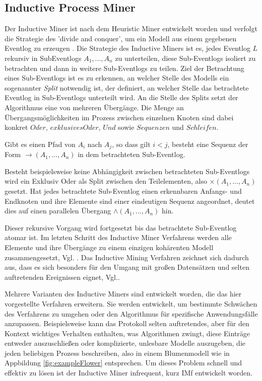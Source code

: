 \subsection{Inductive Process Miner}
Der Inductive Miner ist nach dem Heuristic Miner entwickelt worden und verfolgt die Strategie des 'divide and conquer', um ein Modell aus einem gegebenen Eventlog zu erzeugen \cite{inducMining}. 
Die Strategie des Inductive Miners ist es, jedes Eventlog $L$ rekursiv in SubEventlogs $A_1 , ... , A_n$ zu unterteilen, diese Sub-Eventlogs isoliert zu betrachten und dann in weitere Sub-Eventlogs zu teilen. 
Ziel der Betrachtung eines Sub-Eventlogs ist es zu erkennen, an welcher Stelle des Modells ein sogenannter \textit{Split} notwendig ist, der definiert, an welcher Stelle das betrachtete Eventlog in Sub-Eventlogs unterteilt wird. An die Stelle des Splits setzt der Algorithmus eine von mehreren Übergänge. Die Menge an Übergangsmöglichkeiten im Prozess zwischen einzelnen Knoten sind dabei konkret $Oder$, $exklusives  Oder$, $Und$ sowie $Sequenzen$ und $Schleifen$. 


Gibt es einen Pfad von $A_i$ nach $A_j$, so dass gilt $ i < j $, besteht eine Sequenz der Form $ → (A_1 , ... , A_n)$ in dem betrachteten Sub-Eventlog.

Besteht beispielsweise keine Abhängigkeit zwischen betrachteten Sub-Eventlogs wird ein Exklusiv Oder als Split zwischen den Teilelementen, also $ × (A_1 , ... , A_n)$ gesetzt. 
Hat jedes betrachtete Sub-Eventlog einen erkennbaren Anfangs- und Endknoten und ihre Elemente sind einer eindeutigen Sequenz angeordnet, deutet dies auf einen parallelen Übergang $ ∧ (A_1 , ... , A_n)$ hin. 

Dieser rekursive Vorgang wird fortgesetzt bis das betrachtete Sub-Eventlog atomar ist. Im letzten Schritt des Inductive Miner Verfahrens werden alle Elemente und ihre Übergänge zu einem einzigen kohärenten Modell zusammengesetzt, Vgl. \cite{inducMining}. Das Inductive Mining Verfahren zeichnet sich dadurch aus, dass es sich besonders für den Umgang mit großen Datensätzen und selten auftretenden Ereignissen eignet, Vgl.\cite{minerEval}.

Mehrere Varianten des Inductive Miners sind entwickelt worden, die das hier vorgestellte Verfahren erweitern. Sie werden entwickelt, um bestimmte Schwächen des Verfahrens zu umgehen oder den Algorithmus für spezifische Anwendungsfälle anzupassen. 
Beispielsweise kann das Protokoll selten auftretendes, aber für den Kontext wichtiges Verhalten enthalten, was Algorithmen zwingt, diese Einträge entweder auszuschließen oder komplizierte, unlesbare Modelle auszugeben, die jeden beliebigen Prozess beschreiben, also in einem  Blumenmodell wie in Appbildung \ref{fig:exampleFlower} entsprechen. Um dieses Problem schnell und effektiv zu lösen ist der Inductive Miner infrequent, kurz IMf\cite{inducFMining} entwickelt worden.

